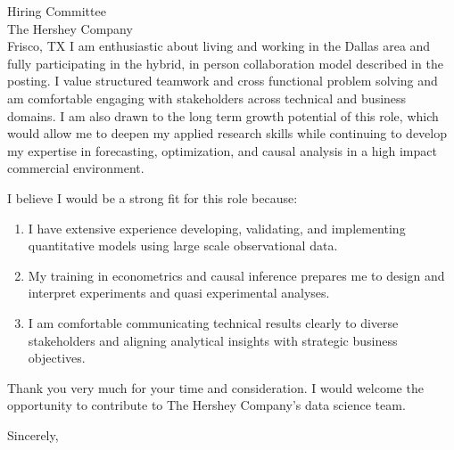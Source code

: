 \documentclass[11pt,letterpaper]{letter}
\begin{document}
\begin{letter}{
Hiring Committee \\
The Hershey Company \\
Frisco, TX
}
I am enthusiastic about living and working in the Dallas area and fully participating in the hybrid, in person collaboration model described in the posting. I value structured teamwork and cross functional problem solving and am comfortable engaging with stakeholders across technical and business domains. I am also drawn to the long term growth potential of this role, which would allow me to deepen my applied research skills while continuing to develop my expertise in forecasting, optimization, and causal analysis in a high impact commercial environment.

I believe I would be a strong fit for this role because:
\begin{enumerate}
    \item I have extensive experience developing, validating, and implementing quantitative models using large scale observational data.
    \item My training in econometrics and causal inference prepares me to design and interpret experiments and quasi experimental analyses.
    \item I am comfortable communicating technical results clearly to diverse stakeholders and aligning analytical insights with strategic business objectives.
\end{enumerate}

Thank you very much for your time and consideration. I would welcome the opportunity to contribute to The Hershey Company’s data science team.

\closing{Sincerely,}

\end{letter}
\end{document}
